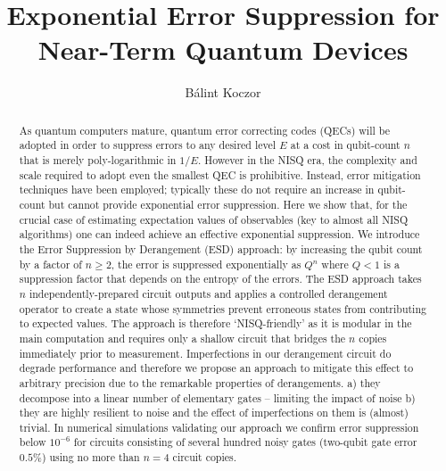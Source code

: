 \documentclass[aps,prx,showpacs,twocolumn,reprint]{revtex4-2}
\begin{document}
	

 



\title{Exponential Error Suppression for Near-Term Quantum Devices}


\author{B\'alint Koczor}




\begin{abstract}
	As quantum computers mature, quantum error correcting codes (QECs) will be adopted in order to suppress errors to any desired level $E$ at a cost in qubit-count $n$ that is merely poly-logarithmic in $1/E$. However in the NISQ era, the complexity and scale required to adopt even the smallest QEC is prohibitive. Instead, error mitigation techniques have been employed; typically these do not require an increase in qubit-count but cannot provide exponential error suppression. Here we show that, for the crucial case of estimating expectation values of observables (key to almost all NISQ algorithms) one can indeed achieve an effective exponential suppression. We introduce the Error Suppression by Derangement (ESD) approach: by increasing the qubit count by a factor of $n\geq 2$, the error is suppressed exponentially as $Q^n$ where $Q<1$ is a suppression factor that depends on the entropy of the errors. The ESD approach takes $n$ independently-prepared circuit outputs and applies a controlled derangement operator to create a state whose symmetries prevent erroneous states from contributing to expected values. The approach is therefore `NISQ-friendly' as it is modular in the main computation and requires only a shallow circuit that bridges the $n$ copies immediately prior to measurement. Imperfections in our derangement circuit do degrade performance and therefore we propose an approach to mitigate this effect to arbitrary precision due to the remarkable properties of derangements. a) they decompose into a linear number of elementary gates -- limiting the impact of noise b) they are highly resilient to noise and the effect of imperfections on them is (almost) trivial. In numerical simulations validating our approach we confirm error suppression below $10^{-6}$ for circuits consisting of several hundred noisy gates (two-qubit gate error $0.5\%$) using no more than $n=4$ circuit copies.
\end{abstract}
\end{document}
